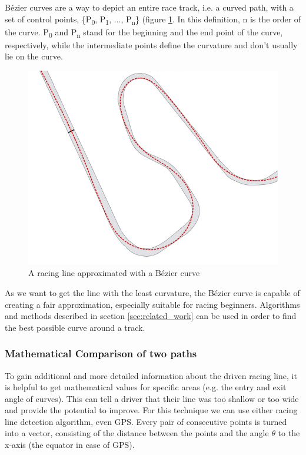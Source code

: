 Bézier curves are a way to depict an entire race track, i.e. a curved path, with a set of control points, \{P\textsubscript{0}, P\textsubscript{1}, ..., P\textsubscript{n}\} (figure \ref{fig:bezier}. In this definition, n is the order of the curve. P\textsubscript{0} and P\textsubscript{n} stand for the beginning and the end point of the curve, respectively, while the intermediate points define the curvature and don't usually lie on the curve.

\begin{figure}[!ht]
\includegraphics[width=\textwidth]{bezier_track}
\caption{A racing line approximated with a Bézier curve}
\label{fig:bezier}
\end{figure}


As we want to get the line with the least curvature, the Bézier curve is capable of creating a fair approximation, especially suitable for racing beginners.
Algorithms and methods described in section \ref{sec:related_work} can be used in order to find the best possible curve around a track.

\subsubsection{Mathematical Comparison of two paths}
To gain additional and more detailed information about the driven racing line, it is helpful to get mathematical values for specific areas (e.g. the entry and exit angle of curves). This can tell a driver that their line was too shallow or too wide and provide the potential to improve.
For this technique we can use either racing line detection algorithm, even GPS. Every pair of consecutive points is turned into a vector, consisting of the distance between the points and the angle $\theta$ to the x-axis (the equator in case of GPS).

